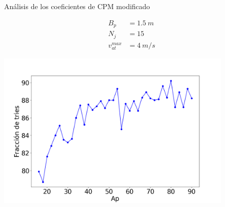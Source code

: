 \begin{frame}{Análisis de los coeficientes de CPM modificado}
    \begin{center}
        \begin{minipage}{0.15\textwidth}
            \begin{equation*}
                \begin{aligned}
                    B_p &= 1.5\ m \\
                    N_j &= 15 \\
                    v_{at}^{max} &= 4\ m/s
                \end{aligned}
            \end{equation*}
        \end{minipage}
        \begin{minipage}{0.80\textwidth}
            \hfill\includegraphics[width=0.85\textwidth]{pic/05-resultados/r5}
        \end{minipage}
    \end{center}
    \footnotesize{}
\end{frame}

